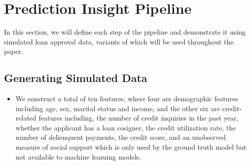 \documentclass[mnsc,blindrev]{informs3}
\begin{document}
\section{Prediction Insight Pipeline}
    \label{sec:pipeline_demo}
    In this section, we will define each step of the pipeline and demonstrate it using simulated loan approval data, variants of which will be used throughout the paper. 

 \subsection{Generating Simulated Data}
    \begin{itemize}
 \item We construct a total of ten features, where four are demographic features including age, sex, marital status and income, and the other six are credit-related features including, the number of credit inquiries in the past year, whether the applicant has a loan cosigner, the credit utilization rate, the number of delienquent payments, the credit score, and an unobserved measure of social support which is only used by the ground truth model but not available to machine learning models.



\end{itemize}
\end{document}
